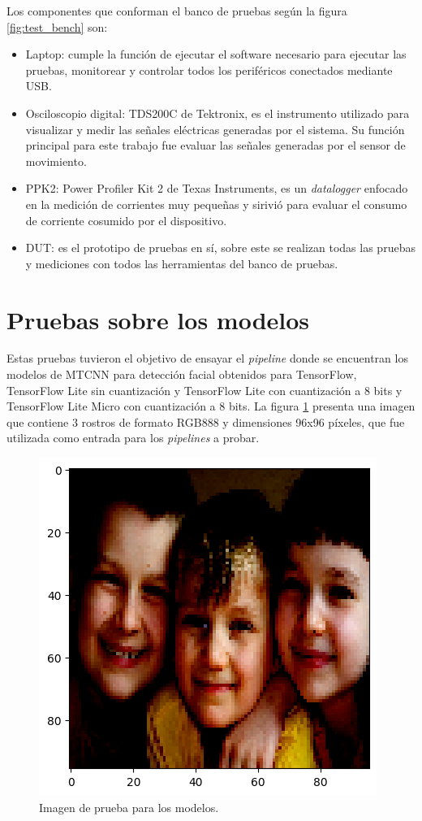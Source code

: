 Los componentes que conforman el banco de pruebas según la figura \ref{fig:test_bench} son:
\begin{itemize}
	\item Laptop: cumple la función de ejecutar el software necesario para ejecutar las pruebas, monitorear y controlar todos los periféricos conectados mediante USB.
	\item Osciloscopio digital: TDS200C de Tektronix, es el instrumento utilizado para visualizar y medir las señales eléctricas generadas por el sistema. Su función principal para este trabajo fue evaluar las señales generadas por el sensor de movimiento.
	\item PPK2: Power Profiler Kit 2 de Texas Instruments, es un \textit{datalogger} enfocado en la medición de corrientes muy pequeñas y sirivió para evaluar el consumo de corriente cosumido por el dispositivo.
	\item DUT: es el prototipo de pruebas en sí, sobre este se realizan todas las pruebas y mediciones con todos las herramientas del banco de pruebas.
\end{itemize}

\section{Pruebas sobre los modelos}
Estas pruebas tuvieron el objetivo de ensayar el \textit{pipeline} donde se encuentran los modelos de MTCNN para detección facial obtenidos para TensorFlow, TensorFlow Lite sin cuantización y TensorFlow Lite con cuantización a 8 bits y TensorFlow Lite Micro con cuantización a 8 bits. La figura \ref{fig:test_image} presenta una imagen que contiene 3 rostros de formato RGB888 y dimensiones 96x96 píxeles, que fue utilizada como entrada para los \textit{pipelines} a probar.

\begin{figure}[h]
	\centering
	\includegraphics[scale=0.75]{./Figures/test_image.png}
	\caption{Imagen de prueba para los modelos.}
	\label{fig:test_image}
\end{figure}

